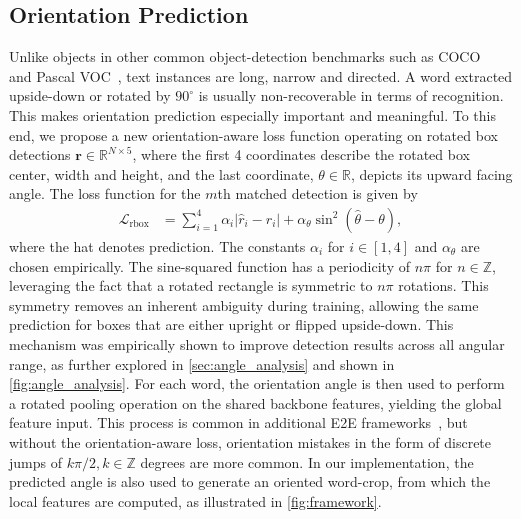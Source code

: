 \documentclass[runningheads]{llncs}
\begin{document}
\subsection{Orientation Prediction}
\label{sec:detection}

Unlike objects in other common object-detection benchmarks such as COCO~\cite{mscoco2014} and Pascal VOC~\cite{pascalvoc}, text instances are long, narrow and directed.
A word extracted upside-down or rotated by $90^{\circ}$ is usually non-recoverable in terms of recognition.
This makes orientation prediction especially important and meaningful.
To this end, we propose a new orientation-aware loss function operating on rotated box detections $\mathbf{r}\in\mathbb{R}^{N\times 5}$, where the first 4 coordinates describe the rotated box center, width and height, and the last coordinate, $\theta\in\mathbb R$, depicts its upward facing angle.
The loss function for the $m$th matched detection is given by
\begin{align}
\mathcal{L}_\text{rbox} & = \sum_{i=1}^{4} \alpha_i \left| \hat{r}_i - r_i \right| + \alpha_\theta \sin^2 \left( \hat{\theta} - \theta \right),
\label{eq:rbox_loss}
\end{align}
where the hat denotes prediction.
The constants $\alpha_i$ for $i\in[1,4]$ and $\alpha_\theta$ are chosen empirically.
The sine-squared function has a periodicity of $n\pi$ for $n \in \mathbb{Z}$, leveraging the fact that a rotated rectangle is symmetric to $n\pi$ rotations.
This symmetry removes an inherent ambiguity during training, allowing the same prediction for boxes that are either upright or flipped upside-down.
This mechanism was empirically shown to improve detection results across all angular range, as further explored in \cref{sec:angle_analysis} and shown in \cref{fig:angle_analysis}.
For each word, the orientation angle is then used to perform a rotated pooling operation on the shared backbone features, yielding the global feature input.
This process is common in additional E2E frameworks~\cite{liu2021abcnetV2,liao2020spotterV3}, but without the orientation-aware loss, orientation mistakes in the form of discrete jumps of $k\pi/2, k\in\mathbb{Z}$ degrees are more common.
In our implementation, the predicted angle is also used to generate an  oriented word-crop, from which the local features are computed, as illustrated in \cref{fig:framework}.
\end{document}
